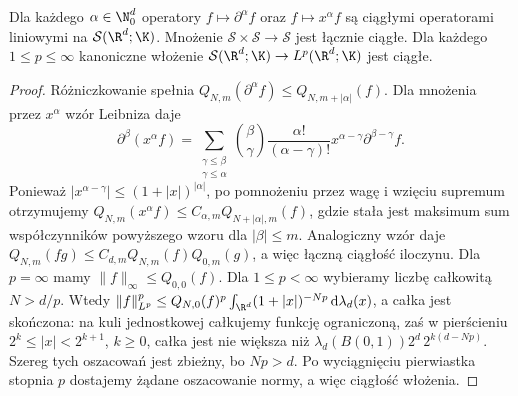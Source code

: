 \begin{stwierdzenie}
\label{prop:schwartz-operators17}
Dla każdego $\alpha\in\N_0^d$ operatory
$f\mapsto\partial^\alpha f$ oraz $f\mapsto x^\alpha f$
są ciągłymi operatorami liniowymi na $\mathcal S(\R^d;\K)$.
Mnożenie $\mathcal S\times\mathcal S\to\mathcal S$ jest
łącznie ciągłe. Dla każdego $1\le p\le\infty$
kanoniczne włożenie $\mathcal S(\R^d;\K)\to L^p(\R^d;\K)$
jest ciągłe.
\end{stwierdzenie}
\begin{proof}
Różniczkowanie spełnia
$Q_{N,m}(\partial^\alpha f)\le Q_{N,m+|\alpha|}(f)$.
Dla mnożenia przez $x^\alpha$ wzór Leibniza daje
\[
\partial^\beta(x^\alpha f)=
\sum_{\substack{\gamma\le\beta\\\gamma\le\alpha}}
\binom{\beta}{\gamma}\frac{\alpha!}{(\alpha-\gamma)!}
x^{\alpha-\gamma}\partial^{\beta-\gamma}f.
\]
Ponieważ $|x^{\alpha-\gamma}|\le(1+|x|)^{|\alpha|}$,
po pomnożeniu przez wagę i wzięciu supremum otrzymujemy
$Q_{N,m}(x^\alpha f)\le C_{\alpha,m}Q_{N+|\alpha|,m}(f)$,
gdzie stała jest maksimum sum współczynników powyższego wzoru
dla $|\beta|\le m$. Analogiczny wzór daje
$Q_{N,m}(fg)\le C_{d,m}Q_{N,m}(f)Q_{0,m}(g)$,
a więc łączną ciągłość iloczynu.
Dla $p=\infty$ mamy $\|f\|_\infty\le Q_{0,0}(f)$.
Dla $1\le p<\infty$ wybieramy liczbę całkowitą $N>d/p$.
Wtedy
$\|f\|_{L^p}^p\le Q_{N,0}(f)^p
\int_{\R^d}(1+|x|)^{-Np}\,\mathrm d\lambda_d(x)$,
a całka jest skończona: na kuli jednostkowej całkujemy
funkcję ograniczoną, zaś w pierścieniu
$2^k\le|x|<2^{k+1}$, $k\ge0$, całka jest nie większa niż
$\lambda_d(B(0,1))2^d\,2^{k(d-Np)}$.
Szereg tych oszacowań jest zbieżny, bo $Np>d$.
Po wyciągnięciu pierwiastka stopnia $p$ dostajemy
żądane oszacowanie normy, a więc ciągłość włożenia.
\end{proof}

